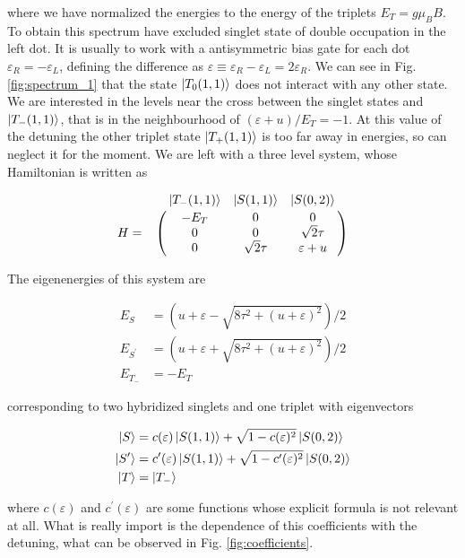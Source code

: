 \documentclass[aip,rsi,amsmath,amssymb,reprint, english]{revtex4-1}
\begin{document}
where we have normalized the energies to the energy of the triplets $E_T=g\mu_BB$. To obtain this spectrum have excluded singlet state of double occupation in the left dot. It is usually to work with a antisymmetric bias gate for each dot $\varepsilon_R=-\varepsilon_L$, defining the difference as $\varepsilon\equiv\varepsilon_R-\varepsilon_L=2\varepsilon_R$. We can see in Fig. \ref{fig:spectrum_1} that the state $\ket{T_0(1,1)}$ does not interact with any other state. We are interested in the levels near the cross between the singlet states and $\ket{T_-(1,1)}$, that is in the neighbourhood of $(\varepsilon+u)/E_T=-1$. At this value of the detuning the other triplet state $\ket{T_+(1,1)}$ is too far away in energies, so can neglect it for the moment. We are left with a three level system, whose Hamiltonian is written as

\begin{equation}
	H=\bordermatrix{~ & \ket{T_-(1,1)} & \ket{S(1,1)} & \ket{S(0,2)}\cr
		~ & -E_T & 0 & 0 \cr
		~ & 0 & 0 & \sqrt{2}\tau \cr
		~ & 0 & \sqrt{2}\tau & \varepsilon+u \cr}
\end{equation}

The eigenenergies of this system are

 \begin{equation}
 	\begin{split}
 	E_S&=(u+\varepsilon-\sqrt{8\tau^2+(u+\varepsilon)^2})/2\\
 	E_{S^{\prime}}&=(u+\varepsilon+\sqrt{8\tau^2+(u+\varepsilon)^2})/2\\
 	E_{T_-}&=-E_T
 	\end{split}
 \end{equation}
 
 corresponding to two hybridized singlets and one triplet with eigenvectors
 
 \begin{equation}
 	\begin{split}
 	\ket{S}&=c(\varepsilon)\ket{S(1,1)}+\sqrt{1-c(\varepsilon)^2}\ket{S(0,2)}\\
 	\ket{S^{\prime}}&=c^{\prime}(\varepsilon)\ket{S(1,1)}+\sqrt{1-c^{\prime}(\varepsilon)^2}\ket{S(0,2)}\\
 	\ket{T}&=\ket{T_-}
 	\end{split}
 	\label{eq:hibrid_coefficients}
 \end{equation}

where $c(\varepsilon)$ and $c^{\prime}(\varepsilon)$ are some functions whose explicit formula is not relevant at all. What is really import is the dependence of this coefficients with the detuning, what can be observed in Fig. \ref{fig:coefficients}.
\end{document}
